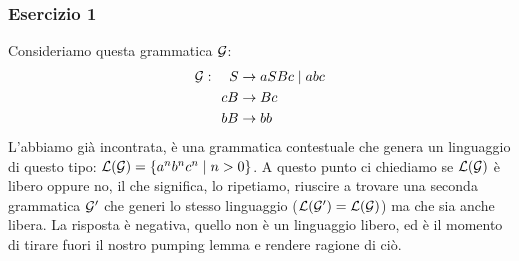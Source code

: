 \documentclass[class=book, crop=false, oneside, 12pt]{standalone}
\begin{document}
  \subsubsection{Esercizio 1}
  Consideriamo questa grammatica \(\mathcal{G}\):
  \begin{align*}
    \mathcal{G}: \quad S &\to aSBc \mid abc \\
    \quad cB &\to Bc\\
    \quad bB &\to bb
  \end{align*}
  L'abbiamo già incontrata, è una grammatica contestuale che genera un linguaggio di questo tipo: \(\mathcal{L}(\mathcal{G}) = \{a^nb^nc^n \mid n > 0\}\). A questo punto ci chiediamo se \(\mathcal{L}(\mathcal{G})\) è libero oppure no, il che significa, lo ripetiamo, riuscire a trovare una seconda grammatica \(\mathcal{G}'\) che generi lo stesso linguaggio (\(\mathcal{L}(\mathcal{G}') = \mathcal{L}(\mathcal{G})\)) ma che sia anche libera. La risposta è negativa, quello non è un linguaggio libero, ed è il momento di tirare fuori il nostro pumping lemma e rendere ragione di ciò.
\end{document}
